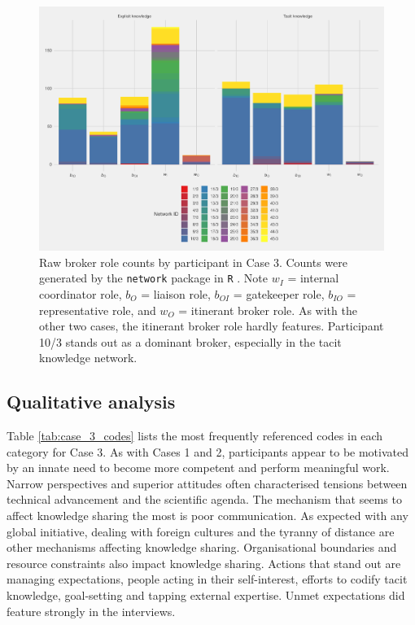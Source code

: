 \begin{figure}
\centering
\includegraphics[width = \textwidth]{Images/gf_case3.pdf}
\caption[Raw broker role counts by participant in Case 3]{Raw broker role counts by participant in Case 3. Counts were generated by the \texttt{network} package in \texttt{R} \citep{butts2008social}. Note $w_I$ = internal coordinator role, $b_O$ = liaison role, $b_{OI}$ = gatekeeper role, $b_{IO}$ = representative role, and $w_O$ = itinerant broker role. As with the other two cases, the itinerant broker role hardly features. Participant 10/3 stands out as a dominant broker, especially in the tacit knowledge network.}
\label{fig:gf_c3}
\end{figure}

\subsection{Qualitative analysis}

Table \ref{tab:case_3_codes} lists the most frequently referenced codes in each category for Case 3. As with Cases 1 and 2, participants appear to be motivated by an innate need to become more competent and perform meaningful work. Narrow perspectives and superior attitudes often characterised tensions between technical advancement and the scientific agenda. The mechanism that seems to affect knowledge sharing the most is poor communication. As expected with any global initiative, dealing with foreign cultures and the tyranny of distance are other mechanisms affecting knowledge sharing. Organisational boundaries and resource constraints also impact knowledge sharing. Actions that stand out are managing expectations, people acting in their self-interest, efforts to codify tacit knowledge, goal-setting and tapping external expertise. Unmet expectations did feature strongly in the interviews.

